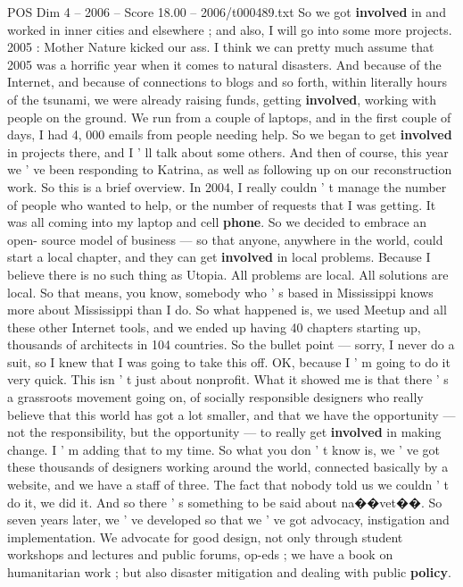 \begin{textsample}{POS Dim 4 – 2006 – Score 18.00 – 2006/t000489.txt}
So we got \textbf{involved} in and worked in inner cities and elsewhere ; and also, I will go into some more projects. 2005 : Mother Nature kicked our ass.
I think we can pretty much assume that 2005 was a horrific year when it comes to natural disasters.
And because of the Internet, and because of connections to blogs and so forth, within literally hours of the tsunami, we were already raising funds, getting \textbf{involved}, working with people on the ground.
We run from a couple of laptops, and in the first couple of days, I had 4, 000 emails from people needing help.
So we began to get \textbf{involved} in projects there, and I ' ll talk about some others.
And then of course, this year we ' ve been responding to Katrina, as well as following up on our reconstruction work.
So this is a brief overview.
In 2004, I really couldn ' t manage the number of people who wanted to help, or the number of requests that I was getting.
It was all coming into my laptop and cell \textbf{phone}.
So we decided to embrace an open- source model of business — so that anyone, anywhere in the world, could start a local chapter, and they can get \textbf{involved} in local problems.
Because I believe there is no such thing as Utopia.
All problems are local.
All solutions are local.
So that means, you know, somebody who ' s based in Mississippi knows more about Mississippi than I do.
So what happened is, we used Meetup and all these other Internet tools, and we ended up having 40 chapters starting up, thousands of architects in 104 countries.
So the bullet point — sorry, I never do a suit, so I knew that I was going to take this off.
OK, because I ' m going to do it very quick.
This isn ' t just about nonprofit.
What it showed me is that there ' s a grassroots movement going on, of socially responsible designers who really believe that this world has got a lot smaller, and that we have the opportunity — not the responsibility, but the opportunity — to really get \textbf{involved} in making change.
I ' m adding that to my time.
So what you don ' t know is, we ' ve got these thousands of designers working around the world, connected basically by a website, and we have a staff of three.
The fact that nobody told us we couldn ' t do it, we did it.
And so there ' s something to be said about na{\EmojiFont �}{\EmojiFont �}vet{\EmojiFont �}{\EmojiFont �}.
So seven years later, we ' ve developed so that we ' ve got advocacy, instigation and implementation.
We advocate for good design, not only through student workshops and lectures and public forums, op-eds ; we have a book on humanitarian work ; but also disaster mitigation and dealing with public \textbf{policy}.

\end{textsample}
